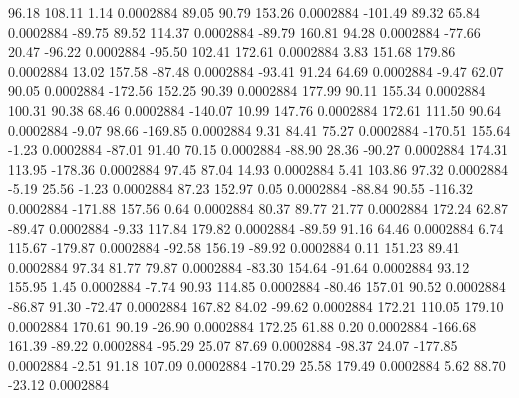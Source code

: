        96.18      108.11        1.14     0.0002884
       89.05       90.79      153.26     0.0002884
     -101.49       89.32       65.84     0.0002884
      -89.75       89.52      114.37     0.0002884
      -89.79      160.81       94.28     0.0002884
      -77.66       20.47      -96.22     0.0002884
      -95.50      102.41      172.61     0.0002884
        3.83      151.68      179.86     0.0002884
       13.02      157.58      -87.48     0.0002884
      -93.41       91.24       64.69     0.0002884
       -9.47       62.07       90.05     0.0002884
     -172.56      152.25       90.39     0.0002884
      177.99       90.11      155.34     0.0002884
      100.31       90.38       68.46     0.0002884
     -140.07       10.99      147.76     0.0002884
      172.61      111.50       90.64     0.0002884
       -9.07       98.66     -169.85     0.0002884
        9.31       84.41       75.27     0.0002884
     -170.51      155.64       -1.23     0.0002884
      -87.01       91.40       70.15     0.0002884
      -88.90       28.36      -90.27     0.0002884
      174.31      113.95     -178.36     0.0002884
       97.45       87.04       14.93     0.0002884
        5.41      103.86       97.32     0.0002884
       -5.19       25.56       -1.23     0.0002884
       87.23      152.97        0.05     0.0002884
      -88.84       90.55     -116.32     0.0002884
     -171.88      157.56        0.64     0.0002884
       80.37       89.77       21.77     0.0002884
      172.24       62.87      -89.47     0.0002884
       -9.33      117.84      179.82     0.0002884
      -89.59       91.16       64.46     0.0002884
        6.74      115.67     -179.87     0.0002884
      -92.58      156.19      -89.92     0.0002884
        0.11      151.23       89.41     0.0002884
       97.34       81.77       79.87     0.0002884
      -83.30      154.64      -91.64     0.0002884
       93.12      155.95        1.45     0.0002884
       -7.74       90.93      114.85     0.0002884
      -80.46      157.01       90.52     0.0002884
      -86.87       91.30      -72.47     0.0002884
      167.82       84.02      -99.62     0.0002884
      172.21      110.05      179.10     0.0002884
      170.61       90.19      -26.90     0.0002884
      172.25       61.88        0.20     0.0002884
     -166.68      161.39      -89.22     0.0002884
      -95.29       25.07       87.69     0.0002884
      -98.37       24.07     -177.85     0.0002884
       -2.51       91.18      107.09     0.0002884
     -170.29       25.58      179.49     0.0002884
        5.62       88.70      -23.12     0.0002884
